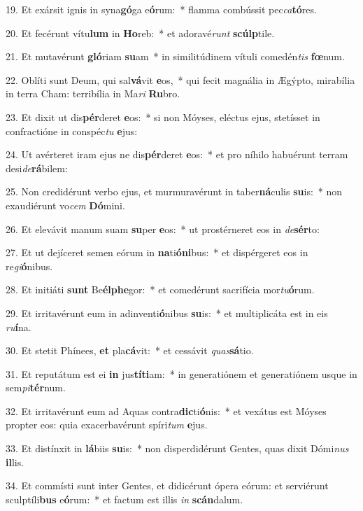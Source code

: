 19. Et exársit ignis in syna\textbf{gó}ga e\textbf{ó}rum:~*  flamma combússit pec\textit{ca}\textbf{tó}res.\

20. Et fecérunt vítu\textbf{lum} in \textbf{Ho}reb:~*  et adoravé\textit{runt} \textbf{scúlp}tile.\

21. Et mutavérunt \textbf{gló}riam \textbf{su}am~*  in similitúdinem vítuli comedén\textit{tis} \textbf{fœ}num.\

22. Oblíti sunt Deum, qui sal\textbf{vá}vit \textbf{e}os,~*  qui fecit magnália in Ægýpto, mirabília in terra Cham: terribília in Ma\textit{ri} \textbf{Ru}bro.\

23. Et dixit ut dis\textbf{pér}deret \textbf{e}os:~*  si non Móyses, eléctus ejus, stetísset in confractióne in conspéc\textit{tu} \textbf{e}jus:\

24. Ut avérteret iram ejus ne dis\textbf{pér}deret \textbf{e}os:~*  et pro níhilo habuérunt terram desi\textit{de}\textbf{rá}bilem:\

25. Non credidérunt verbo ejus, et murmuravérunt in taber\textbf{ná}culis \textbf{su}is:~*  non exaudiérunt vo\textit{cem} \textbf{Dó}mini.\

26. Et elevávit manum suam \textbf{su}per \textbf{e}os:~*  ut prostérneret eos in \textit{de}\textbf{sér}to:\

27. Et ut dejíceret semen eórum in \textbf{na}ti\textbf{ó}\textbf{ni}bus:~*  et dispérgeret eos in re\textit{gi}\textbf{ó}nibus.\

28. Et initiáti \textbf{sunt} Be\textbf{él}\textbf{phe}gor:~*  et comedérunt sacrifícia mor\textit{tu}\textbf{ó}rum.\

29. Et irritavérunt eum in adinventi\textbf{ó}nibus \textbf{su}is:~*  et multiplicáta est in eis \textit{ru}\textbf{í}na.\

30. Et stetit Phínees, \textbf{et} pla\textbf{cá}vit:~*  et cessávit \textit{quas}\textbf{sá}tio.\

31. Et reputátum est ei \textbf{in} jus\textbf{tí}\textbf{ti}am:~*  in generatiónem et generatiónem usque in sem\textit{pi}\textbf{tér}num.\

32. Et irritavérunt eum ad Aquas contra\textbf{dic}ti\textbf{ó}nis:~*  et vexátus est Móyses propter eos: quia exacerbavérunt spíri\textit{tum} \textbf{e}jus.\

33. Et distínxit in \textbf{lá}biis \textbf{su}is:~*  non disperdidérunt Gentes, quas dixit Dómi\textit{nus} \textbf{il}lis.\

34. Et commísti sunt inter Gentes, et didicérunt ópera eórum: et serviérunt sculptíli\textbf{bus} e\textbf{ó}rum:~*  et factum est illis \textit{in} \textbf{scán}dalum.\

